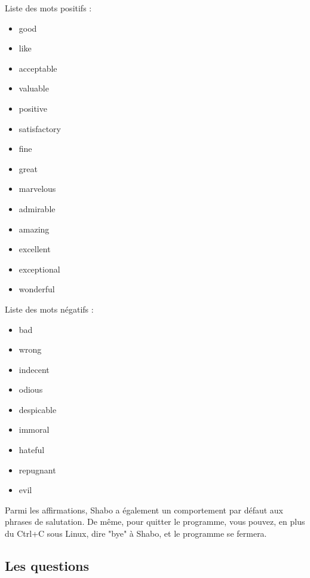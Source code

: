 \documentclass[paper=a4]{article}
\begin{document}
Liste des mots positifs :
\begin{multicols}{4} %
    \begin{itemize}
        \item good
        \item like
        \item acceptable
        \item valuable
        \item positive
        \item satisfactory
        \item fine
        \item great
        \item marvelous
        \item admirable
        \item amazing
        \item excellent
        \item exceptional
        \item wonderful
    \end{itemize}
\end{multicols}

Liste des mots négatifs :
\begin{multicols}{4} %
    \begin{itemize}
        \item bad
        \item wrong
        \item indecent
        \item odious
        \item despicable
        \item immoral
        \item hateful
        \item repugnant
        \item evil
    \end{itemize}
\end{multicols}


Parmi les affirmations, Shabo a également un comportement par défaut
aux phrases de salutation. De même, pour quitter le programme, vous
pouvez, en plus du Ctrl+C sous Linux, dire "bye" à Shabo, et le
programme se fermera.

\subsection{Les questions}
\end{document}
